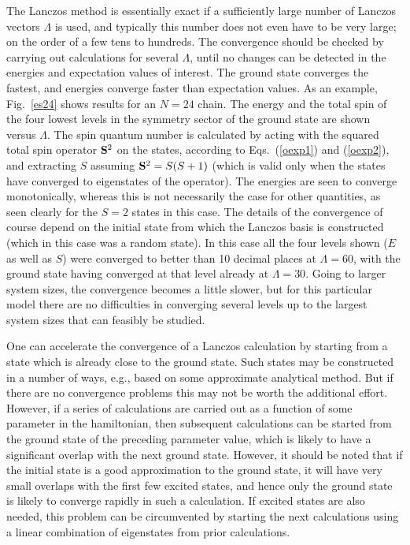 \documentclass[draft,numberedheadings]{aipproc}
\begin{document}
The Lanczos method is essentially exact if a sufficiently large number of Lanczos vectors $\Lambda$ is used, and typically this number does not even 
have to be very large; on the order of a few tens to hundreds. The convergence should be checked by carrying out calculations for several $\Lambda$,
until no changes can be detected in the energies and expectation values of interest. The ground state converges the fastest, and energies converge 
faster than expectation values. As an example, Fig.~\ref{es24} shows results for an $N=24$ chain. The energy and the total spin of the four lowest 
levels in the symmetry sector of the ground state are shown versus $\Lambda$. The spin quantum number is calculated by acting with the squared total spin 
operator ${\bf S}^2$ on the states, according to Eqs.~(\ref{oexp1}) and (\ref{oexp2}), and extracting $S$ assuming ${\bf S}^2=S(S+1)$ (which is 
valid only when the states have converged to eigenstates of the operator). The energies are seen to converge monotonically, whereas this is not
necessarily the case for other quantities, as seen clearly for the $S=2$ states in this case. The details of the convergence of course depend on 
the initial state from which the Lanczos basis is constructed (which in this case was a random state). 
In this case all the four levels shown ($E$ as well as $S$) were converged to better 
than 10 decimal places at $\Lambda=60$, with the ground state having converged at that level already at $\Lambda=30$. Going to larger system sizes, the 
convergence becomes a little slower, but for this particular model there are no difficulties in converging several levels up to the largest system 
sizes that can feasibly be studied.

One can accelerate the convergence of a Lanczos calculation by starting from a state which is already close to the ground state. Such states may be
constructed in a number of ways, e.g., based on some approximate analytical method. But if there are no convergence problems this may not be worth
the additional effort. However, if a series of calculations are carried out as a function of some parameter in the hamiltonian, then subsequent 
calculations can be started from the ground state of the preceding parameter value, which is likely to have a significant overlap with the next
ground state. However, it should be noted that if the initial state is a good approximation to the ground state, it will have very small overlaps 
with the first few excited states, and hence only the ground state is likely to converge rapidly in such a calculation. If excited states are also
needed, this problem can be circumvented by starting the next calculations using a linear combination of eigenstates from prior calculations.
\end{document}

